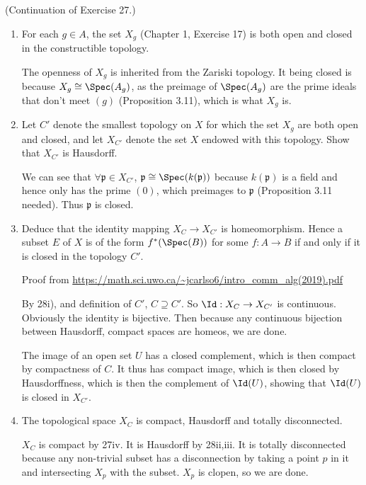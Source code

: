 \documentclass[a4paper]{exam}
\begin{document}
\begin{questions}
\question (Continuation of Exercise 27.)
\begin{enumerate}
\item For each $g \in A $, the set $X_g $ (Chapter 1, Exercise 17) is both open and closed in the constructible topology.
\begin{solution}
	The openness of $X_g $ is inherited from the Zariski topology.
	It being closed is because $X_g \cong \Spec(A_g) $, as the preimage of $\Spec(A_g) $ are the prime ideals that don't meet $(g) $ (Proposition 3.11), which is what $X_g$ is.
\end{solution}
\item Let $C' $ denote the smallest topology on $X $ for which the set $X_g $ are both open and closed, and let $X_{C'} $ denote the set $X $ endowed with this topology. Show that $X_{C'} $ is Hausdorff.
\begin{solution}
	We can see that $\forall \mathfrak{p} \in X_{C'} $, $\mathfrak{p} \cong \Spec(k(\mathfrak{p})) $ because $k(\mathfrak{p}) $ is a field and hence only has the prime $(0) $, which preimages to $\mathfrak{p} $ (Proposition 3.11 needed).
	Thus $\mathfrak{p} $ is closed.
\end{solution}
\item Deduce that the identity mapping $X_C \to X_{C'} $ is homeomorphism. Hence a subset $E $ of $X $ is of the form $f^\ast(\Spec(B)) $ for some $f: A\to B $ if and only if it is closed in the topology $C' $.
\begin{solution}
	Proof from \url{https://math.sci.uwo.ca/~jcarlso6/intro_comm_alg(2019).pdf}

	By 28i), and definition of $C' $, $C \supseteq C' $.
	So $\Id:X_C\to X_{C'} $ is continuous.
	Obviously the identity is bijective.
	Then because any continuous bijection between Hausdorff, compact spaces are homeos, we are done.

	The image of an open set $U $ has a closed complement, which is then compact by compactness of $C $.
	It thus has compact image, which is then closed by Hausdorffness, which is then the complement of $\Id(U) $, showing that $\Id(U) $ is closed in $X_{C'} $.
\end{solution}
\item The topological space $X_C $ is compact, Hausdorff and totally disconnected.
\begin{solution}
	$X_C $ is compact by 27iv.
	It is Hausdorff by 28ii,iii.
	It is totally disconnected because any non-trivial subset has a disconnection by taking a point $p $ in it and intersecting $X_p $ with the subset.
	$X_p $ is clopen, so we are done.
\end{solution}
\end{enumerate}


\end{questions}
\end{document}
